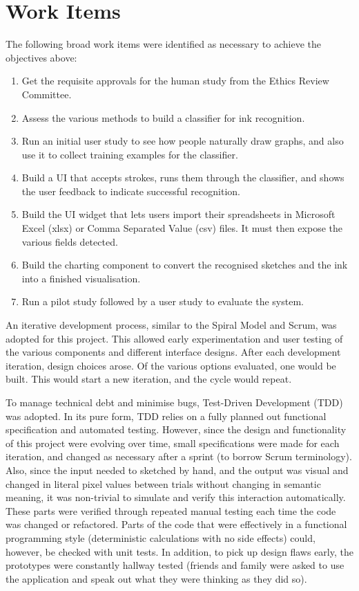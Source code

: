 	\section{Work Items}

	The following broad work items were identified as necessary to achieve the objectives above:
	\begin{enumerate}
		\item Get the requisite approvals for the human study from the Ethics Review Committee.
		\item Assess the various methods to build a classifier for ink recognition.
		\item Run an initial user study to  see how people naturally draw graphs, and also use it to collect training examples for the classifier.
		\item Build a UI that accepts strokes, runs them through the classifier, and shows the user feedback to indicate successful recognition.
		\item Build the UI widget that lets users import their spreadsheets in Microsoft Excel (xlsx) or Comma Separated Value (csv) files. It must then expose the various fields detected.
		\item Build the charting component to convert the recognised sketches and the ink into a finished visualisation.
		\item Run a pilot study followed by a user study to evaluate the system.
	\end{enumerate}	
	
	An iterative development process, similar to the Spiral Model and Scrum, was adopted for this project. This allowed early experimentation and user testing of the various components and different interface designs. After each development iteration, design choices arose. Of the various options evaluated, one would be built. This would start a new iteration, and the cycle would repeat.
	
	To manage technical debt and minimise bugs, Test-Driven Development (TDD) was adopted. In its pure form, TDD relies on a fully planned out functional specification and automated testing. However, since the design and functionality of this project were evolving over time, small specifications were made for each iteration, and changed as necessary after a sprint (to borrow Scrum terminology). Also, since the input needed to sketched by hand, and the output was visual and changed in literal pixel values between trials without changing in semantic meaning, it was non-trivial to simulate and verify this interaction automatically. These parts were verified through repeated manual testing each time the code was changed or refactored. Parts of the code that were effectively in a functional programming style (deterministic calculations with no side effects) could, however, be checked with unit tests. In addition, to pick up design flaws early, the prototypes were constantly hallway tested (friends and family were asked to use the application and speak out what they were thinking as they did so).
	
